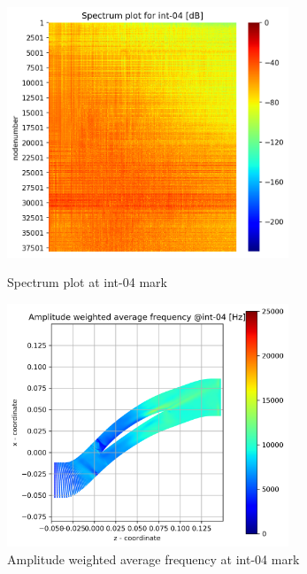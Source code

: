 \begin{figure}[ht]
  \centering
  \includegraphics[width=0.75\textwidth]{Figures/int-04_spectrum.png}
  \caption{Spectrum plot at int-04 mark} \label{int-04-spectrum}
  
  \vspace*{\floatsep}%

  \includegraphics[width=0.75\textwidth]{Figures/int-04-awaf.png}
  \caption{Amplitude weighted average frequency at int-04 mark} \label{int-04-awaf}
\end{figure}
